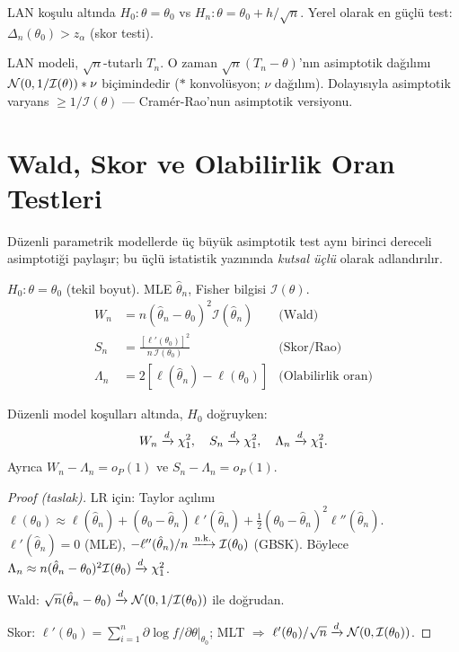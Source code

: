 \begin{teorem}\label{thm:lan_optimum}
LAN koşulu altında $H_0:\theta=\theta_0$ vs $H_n:\theta=\theta_0+h/\sqrt{n}$. Yerel olarak en güçlü test: $\Delta_n(\theta_0)>z_\alpha$ (skor testi).
\end{teorem}

\begin{teorem}\label{thm:convolution}
LAN modeli, $\sqrt{n}$-tutarlı $T_n$. O zaman $\sqrt{n}(T_n-\theta)$'nın asimptotik dağılımı $\mathcal{N}(0,1/\mathcal{I}(\theta))*\nu$ biçimindedir ($*$ konvolüsyon; $\nu$ dağılım). Dolayısıyla asimptotik varyans $\geq 1/\mathcal{I}(\theta)$ --- Cramér-Rao'nun asimptotik versiyonu.
\end{teorem}

\section{Wald, Skor ve Olabilirlik Oran Testleri}
\label{sec:uc_test}

Düzenli parametrik modellerde üç büyük asimptotik test aynı birinci dereceli asimptotiği paylaşır; bu üçlü istatistik yazınında \emph{kutsal üçlü} olarak adlandırılır.

\begin{tanim}\label{def:uc_test}
$H_0:\theta=\theta_0$ (tekil boyut). MLE $\hat\theta_n$, Fisher bilgisi $\mathcal{I}(\theta)$.
\begin{align*}
W_n &= n(\hat\theta_n-\theta_0)^2\mathcal{I}(\hat\theta_n) & \text{(Wald)} \\
S_n &= \frac{[\ell'(\theta_0)]^2}{n\,\mathcal{I}(\theta_0)} & \text{(Skor/Rao)} \\
\Lambda_n &= 2[\ell(\hat\theta_n)-\ell(\theta_0)] & \text{(Olabilirlik oran)}
\end{align*}
\end{tanim}

\begin{teorem}\label{thm:uc_test}
Düzenli model koşulları altında, $H_0$ doğruyken:
\[
  W_n \xrightarrow{d} \chi^2_1, \quad S_n \xrightarrow{d} \chi^2_1, \quad \Lambda_n \xrightarrow{d} \chi^2_1.
\]
Ayrıca $W_n - \Lambda_n = o_P(1)$ ve $S_n - \Lambda_n = o_P(1)$.
\end{teorem}

\begin{proof}[Proof (taslak)]
LR için: Taylor açılımı $\ell(\theta_0) \approx \ell(\hat\theta_n) + (\theta_0-\hat\theta_n)\ell'(\hat\theta_n) + \frac12(\theta_0-\hat\theta_n)^2\ell''(\hat\theta_n)$. $\ell'(\hat\theta_n)=0$ (MLE), $-\ell''(\hat\theta_n)/n\xrightarrow{\text{n.k.}}\mathcal{I}(\theta_0)$ (GBSK). Böylece $\Lambda_n\approx n(\hat\theta_n-\theta_0)^2\mathcal{I}(\theta_0)\xrightarrow{d}\chi^2_1$.

Wald: $\sqrt{n}(\hat\theta_n-\theta_0)\xrightarrow{d}\mathcal{N}(0,1/\mathcal{I}(\theta_0))$ ile doğrudan.

Skor: $\ell'(\theta_0)=\sum_{i=1}^n\partial\log f/\partial\theta|_{\theta_0}$; MLT $\Rightarrow$ $\ell'(\theta_0)/\sqrt{n}\xrightarrow{d}\mathcal{N}(0,\mathcal{I}(\theta_0))$.
\end{proof}

